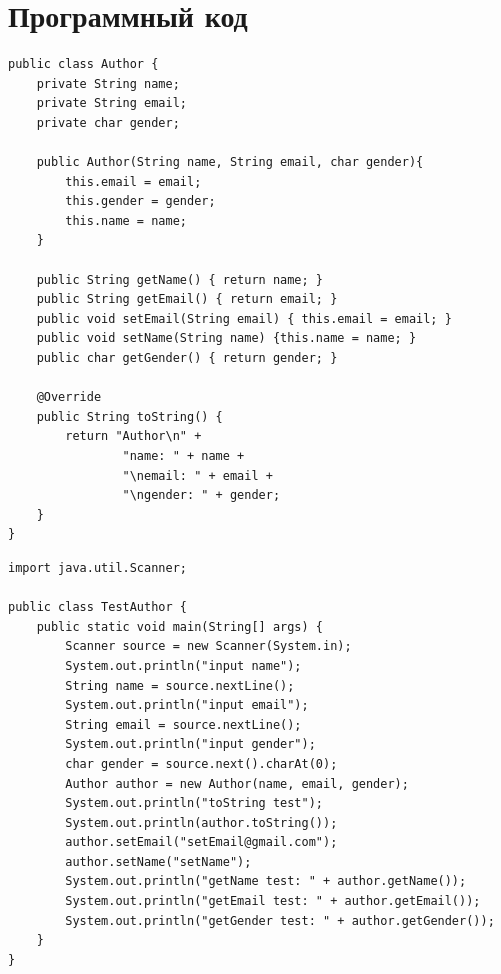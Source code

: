 \documentclass[14pt, a4paper]{extarticle}
\newenvironment{code}{\captionsetup{type=listing}}{}
\begin{document}
\section*{Программный код}
\begin{code}
\begin{Verbatim}[frame=single, fontsize=\footnotesize]
public class Author {
    private String name;
    private String email;
    private char gender;

    public Author(String name, String email, char gender){
        this.email = email;
        this.gender = gender;
        this.name = name;
    }

    public String getName() { return name; }
    public String getEmail() { return email; }
    public void setEmail(String email) { this.email = email; }
    public void setName(String name) {this.name = name; }
    public char getGender() { return gender; }

    @Override
    public String toString() {
        return "Author\n" +
                "name: " + name +
                "\nemail: " + email +
                "\ngender: " + gender;
    }
}
\end{Verbatim}
\end{code}
\begin{code}
\begin{Verbatim}[frame=single, fontsize=\footnotesize]
import java.util.Scanner;

public class TestAuthor {
    public static void main(String[] args) {
        Scanner source = new Scanner(System.in);
        System.out.println("input name");
        String name = source.nextLine();
        System.out.println("input email");
        String email = source.nextLine();
        System.out.println("input gender");
        char gender = source.next().charAt(0);
        Author author = new Author(name, email, gender);
        System.out.println("toString test");
        System.out.println(author.toString());
        author.setEmail("setEmail@gmail.com");
        author.setName("setName");
        System.out.println("getName test: " + author.getName());
        System.out.println("getEmail test: " + author.getEmail());
        System.out.println("getGender test: " + author.getGender());
    }
}
\end{Verbatim}
\end{code}
\end{document}
